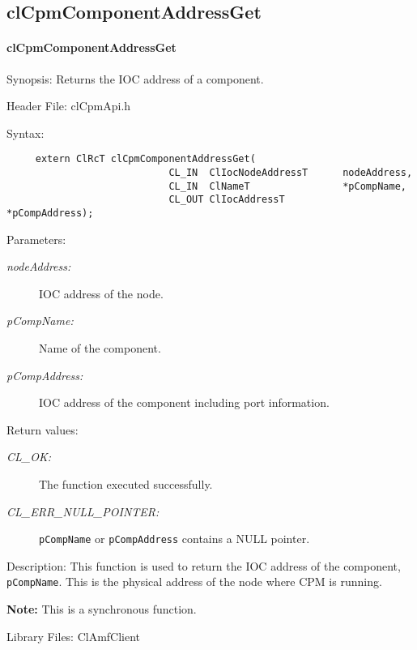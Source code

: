{\subsection{clCpmComponentAddressGet}
\hypertarget{pagecpm131}{}\paragraph{cl\-Cpm\-Component\-Address\-Get}\label{pagecpm131}
\begin{Desc}
\item[Synopsis:]Returns the IOC address of a component.\end{Desc}
\begin{Desc}
\item[Header File:]clCpmApi.h\end{Desc}
\begin{Desc}
\item[Syntax:]

\footnotesize\begin{verbatim}     extern ClRcT clCpmComponentAddressGet(
                			CL_IN  ClIocNodeAddressT      nodeAddress,
                			CL_IN  ClNameT                *pCompName,
                			CL_OUT ClIocAddressT          *pCompAddress);
\end{verbatim}
\normalsize
 \end{Desc}
\begin{Desc}
\item[Parameters:]
\begin{description}
\item[{\em node\-Address:}]IOC address of the node. 
\item[{\em p\-Comp\-Name:}]Name of the component. 
\item[{\em p\-Comp\-Address:}]IOC address of the component including port information.\end{description}
\end{Desc}
\begin{Desc}
\item[Return values:]
\begin{description}
\item[{\em CL\_\-OK:}]The function executed successfully. \item[{\em CL\_\-ERR\_\-NULL\_\-POINTER:}]{\tt{pCompName}} or {\tt{pCompAddress}} contains a NULL pointer.\end{description}
\end{Desc}
\begin{Desc}
\item[Description:]This function is used to return the IOC address of the component, {\tt{p\-Comp\-Name}}. This is the physical address of the node where 
CPM is running.\end{Desc}
{\bf Note:} This is a synchronous function.
\begin{Desc}
\item[Library Files:]Cl\-Amf\-Client\end{Desc}

}
